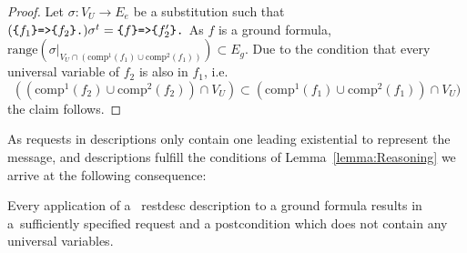 \begin{proof}
 Let $\sigma:V_U\rightarrow E_e$ be a substitution %
 such that  $(\verb!{!f_1\verb!}=>{!f_2\verb!}.!)\sigma^t= \verb!{!f\verb!}=>{!f_2'\verb!}.!$ 
As $f$ is a ground formula, $\text{range}(\sigma|_{V_U\cap(\text{comp}^1(f_1)\cup \text{comp}^2(f_1))}) \subset E_g$. 
Due to the condition that every universal variable of $f_2$ 
is also in $f_1$, i.e. 
\[((\text{comp}^1(f_2)\cup \text{comp}^2(f_2))\cap V_U )\subset (\text{comp}^1(f_1)\cup \text{comp}^2(f_1))\cap V_U)\]
the claim follows. 
%
\end{proof}


As \http requests in \restdesc descriptions only contain
one leading existential to represent the \http message, and 
\restdesc descriptions 
fulfill the conditions of Lemma~\ref{lemma:Reasoning}
we arrive at the following consequence:

\begin{corollary}
\label{corollary}
Every application of a ~restdesc description to a ground formula results in a~sufficiently specified \http request 
and a postcondition which does not contain any universal variables.
\end{corollary}


